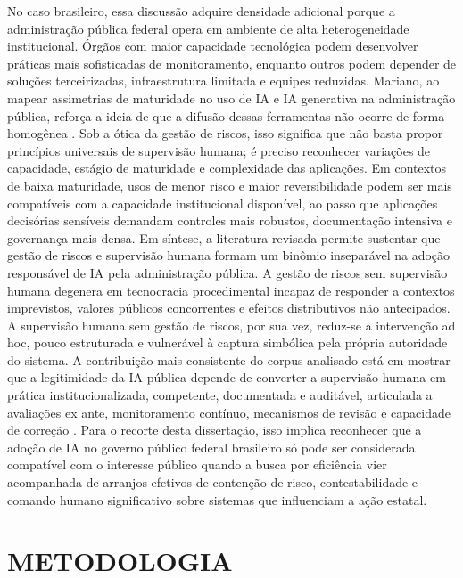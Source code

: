 \documentclass[12pt,a4paper]{article}
\begin{document}
No caso brasileiro, essa discussão adquire densidade adicional porque a administração pública federal opera em ambiente de alta heterogeneidade institucional. Órgãos com maior capacidade tecnológica podem desenvolver práticas mais sofisticadas de monitoramento, enquanto outros podem depender de soluções terceirizadas, infraestrutura limitada e equipes reduzidas. Mariano, ao mapear assimetrias de maturidade no uso de IA e IA generativa na administração pública, reforça a ideia de que a difusão dessas ferramentas não ocorre de forma homogênea \autocite{mariano2026inteligencia}. Sob a ótica da gestão de riscos, isso significa que não basta propor princípios universais de supervisão humana; é preciso reconhecer variações de capacidade, estágio de maturidade e complexidade das aplicações. Em contextos de baixa maturidade, usos de menor risco e maior reversibilidade podem ser mais compatíveis com a capacidade institucional disponível, ao passo que aplicações decisórias sensíveis demandam controles mais robustos, documentação intensiva e governança mais densa.
Em síntese, a literatura revisada permite sustentar que gestão de riscos e supervisão humana formam um binômio inseparável na adoção responsável de IA pela administração pública. A gestão de riscos sem supervisão humana degenera em tecnocracia procedimental incapaz de responder a contextos imprevistos, valores públicos concorrentes e efeitos distributivos não antecipados. A supervisão humana sem gestão de riscos, por sua vez, reduz-se a intervenção ad hoc, pouco estruturada e vulnerável à captura simbólica pela própria autoridade do sistema. A contribuição mais consistente do corpus analisado está em mostrar que a legitimidade da IA pública depende de converter a supervisão humana em prática institucionalizada, competente, documentada e auditável, articulada a avaliações ex ante, monitoramento contínuo, mecanismos de revisão e capacidade de correção \autocite{batool2025ai} \autocite{mkander2023auditing} \autocite{minkkinen2022continuous} \autocite{parycek2023artificial}. Para o recorte desta dissertação, isso implica reconhecer que a adoção de IA no governo público federal brasileiro só pode ser considerada compatível com o interesse público quando a busca por eficiência vier acompanhada de arranjos efetivos de contenção de risco, contestabilidade e comando humano significativo sobre sistemas que influenciam a ação estatal.
\section{METODOLOGIA}
\label{sec:org3ad4e19}
\end{document}
